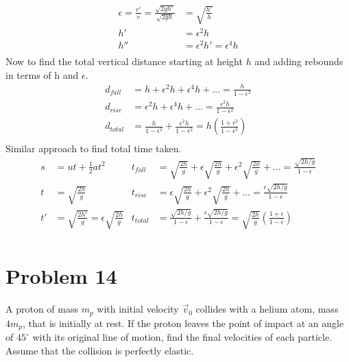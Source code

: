 \documentclass[]{article}
\begin{document}
	\begin{equation}
		\begin{split}
			\epsilon = \frac{v'}{v} = \frac{\sqrt{2gh'}}{\sqrt{2gh}} &= \sqrt{\frac{h'}{h}} \\
			h' &= \epsilon^2 h \\
			h'' &= \epsilon^2 h' = \epsilon^4 h \\
		\end{split}
	\end{equation}
	Now to find the total vertical distance starting at height $h$ and adding rebounds in terms of h and $\epsilon$.
	\begin{equation}
		\begin{split}
			d_{fall} &= h + \epsilon^2 h + \epsilon^4 h + ... = \frac{h}{1 - \epsilon^2} \\
			d_{rise} &= \epsilon^2 h + \epsilon^4 h + ... = \frac{\epsilon^2 h}{1 - \epsilon^2} \\
			d_{total} &= \frac{h}{1 - \epsilon^2} + \frac{\epsilon^2 h}{1 - \epsilon^2} = h\left( \frac{1 + \epsilon^2}{1 - \epsilon^2} \right) \\
		\end{split}
	\end{equation}
	Similar approach to find total time taken.
	\begin{equation}
		\begin{aligned}
			s &= ut + \frac{1}{2}at^2 & t_{fall} &= \sqrt{\frac{2h}{g}} + \epsilon \sqrt{\frac{2h}{g}} + \epsilon^2 \sqrt{\frac{2h}{g}} + ... = \frac{\sqrt{2h/g}}{1 - \epsilon} \\
			t &= \sqrt{\frac{2h}{g}} & t_{rise} &= \epsilon \sqrt{\frac{2h}{g}} + \epsilon^2 \sqrt{\frac{2h}{g}} + ... = \frac{\epsilon \sqrt{2h/g}}{1 - \epsilon} \\
			t' &= \sqrt{\frac{2h'}{g}} = \epsilon \sqrt{\frac{2h}{g}} & t_{total} &= \frac{\sqrt{2h/g}}{1 - \epsilon} + \frac{\epsilon \sqrt{2h/g}}{1 - \epsilon} = \sqrt{\frac{2h}{g}} \left( \frac{1 + \epsilon}{1 - \epsilon} \right) \\
		\end{aligned}
	\end{equation}

	\section{Problem 14}
	
	A proton of mass $m_p$ with initial velocity $\vec{v}_0$ collides with a helium atom, mass $4m_p$, that is initially at rest. If the proton leaves the point of impact at an angle of $45^{\circ}$ with its original line of motion, find the final velocities of each particle. Assume that the collision is perfectly elastic. \\
	
\end{document}
